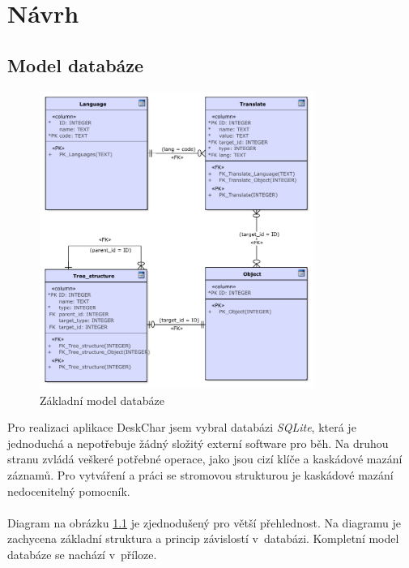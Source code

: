 \documentclass[thesis=B,czech]{resources/FITthesis}[2012/06/26]
\begin{document}
\chapter{Návrh}
	\section{Model databáze}
	\begin{figure}\centering
	\includegraphics[width=0.8\textwidth]{images/basic_database}
	\caption[Základní model databáze]{Základní model databáze}\label{fig:db_basic}
	\end{figure}
	Pro realizaci aplikace DeskChar jsem vybral databázi \textit{SQLite}, která je jednoduchá a nepotřebuje žádný složitý externí software pro běh. Na druhou stranu zvládá veškeré potřebné operace, jako jsou cizí klíče a kaskádové mazání záznamů. Pro vytváření a práci se stromovou strukturou je kaskádové mazání nedocenitelný pomocník. \\
\\
Diagram na obrázku \ref{fig:db_basic} je zjednodušený pro větší přehlednost. Na diagramu je zachycena základní struktura a princip závislostí v~databázi. Kompletní model databáze se nachází v~příloze.\\
\\
\end{document}
